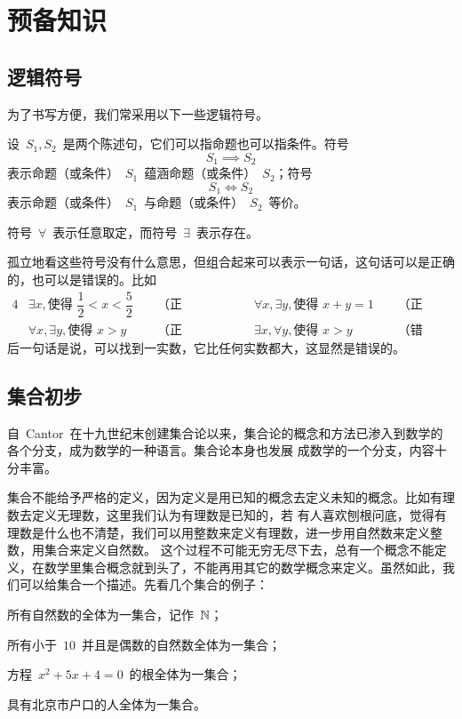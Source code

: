 

\chapter{预备知识}\label{ch:0}

\section{逻辑符号}

为了书写方便，我们常采用以下一些逻辑符号。

设~$S_1,S_2$~是两个陈述句，它们可以指命题也可以指条件。符号
\[
  S_1\implies S_2
\]
表示命题（或条件）~$S_1$~蕴涵命题（或条件）~$S_2$；符号
\[
  S_1\iff S_2
\]
表示命题（或条件）~$S_1$~与命题（或条件）~$S_2$~等价。

符号~$\forall$~表示任意取定，而符号~$\exists$~表示存在。

孤立地看这些符号没有什么意思，但组合起来可以表示一句话，这句话可以是正确的，也可以是错误的。比如
\begin{alignat*}{4}
&\exists x,\text{使得~}\dfrac 12<x<\dfrac 52 &\enspace&\text{（正确）；}
&\qquad&\forall x,\exists y,\text{使得~}x+y=1 &\enspace&\text{（正确）；}\\
&\forall x,\exists y,\text{使得~}x>y & &\text{（正确）；}
&\qquad&\exists x,\forall y,\text{使得~}x>y & &\text{（错误）。}
\end{alignat*}
后一句话是说，可以找到一实数，它比任何实数都大，这显然是错误的。

\section{集合初步}

自~Cantor~在十九世纪末创建集合论以来，集合论的概念和方法已渗入到数学的各个分支，成为数学的一种语言。集合论本身也发展
成数学的一个分支，内容十分丰富。

集合不能给予严格的定义，因为定义是用已知的概念去定义未知的概念。比如有理数去定义无理数，这里我们认为有理数是已知的，若
有人喜欢刨根问底，觉得有理数是什么也不清楚，我们可以用整数来定义有理数，进一步用自然数来定义整数，用集合来定义自然数。%
这个过程不可能无穷无尽下去，总有一个概念不能定义，在数学里集合概念就到头了，不能再用其它的数学概念来定义。虽然如此，我
们可以给集合一个描述。先看几个集合的例子：

\begin{enumlist}
\item 所有自然数的全体为一集合，记作~$\mathbb{N}$；\label{enum:set1}
\item 所有小于~$10$~并且是偶数的自然数全体为一集合；\label{enum:set2}
\item 方程~$x^2+5x+4=0$~的根全体为一集合；\label{enum:set3}
\item 具有北京市户口的人全体为一集合。\label{enum:set4}
\end{enumlist}

